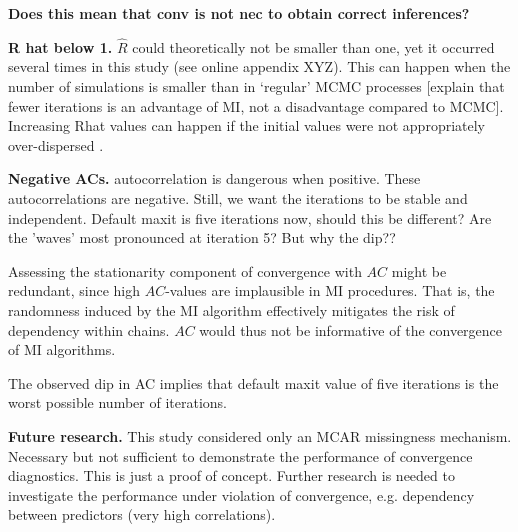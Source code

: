 \documentclass[article]{jss}
\begin{document}
\textbf{Does this mean that conv is not nec to obtain correct inferences?}

\textbf{R hat below 1.}
$\widehat{R}$ could theoretically not be smaller than one, yet it occurred several times in this study (see online appendix XYZ). This can happen when the number of simulations is smaller than in `regular' MCMC processes [explain that fewer iterations is an advantage of MI, not a disadvantage compared to MCMC]. Increasing Rhat values can happen if the initial values were not appropriately over-dispersed \citep[p~438]{broo98}. %


\textbf{Negative ACs.} autocorrelation is dangerous when positive. These autocorrelations are negative. Still, we want the iterations to be stable and independent. Default maxit is five iterations now, should this be different? Are the 'waves' most pronounced at iteration 5? But why the dip?? 

Assessing the stationarity component of convergence with $AC$ might be redundant, since high $AC$-values are implausible in MI procedures. That is, the randomness induced by the MI algorithm effectively mitigates the risk of dependency within chains. $AC$ would thus not be informative of the convergence of MI algorithms. 


The observed dip in AC implies that default maxit value of five iterations is the worst possible number of iterations.

\textbf{Future research.} This study considered only an MCAR missingness mechanism. Necessary but not sufficient to demonstrate the performance of convergence diagnostics. This is just a proof of concept. Further research is needed to investigate the performance under violation of convergence, e.g. dependency between predictors (very high correlations). %
\end{document}
